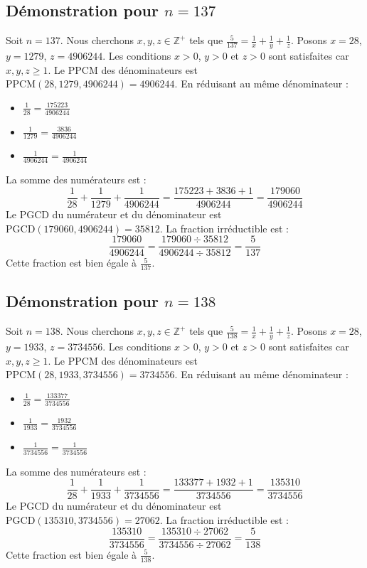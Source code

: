 \documentclass[11pt,a4paper]{article}
\begin{document}
\subsection{Démonstration pour $n = 137$}
Soit $n = 137$. Nous cherchons $x, y, z \in \mathbb{Z}^{+}$ tels que $\frac{5}{137} = \frac{1}{x} + \frac{1}{y} + \frac{1}{z}$.
Posons $x = 28$, $y = 1279$, $z = 4906244$.
Les conditions $x > 0$, $y > 0$ et $z > 0$ sont satisfaites car $x, y, z \geq 1$.
Le PPCM des dénominateurs est $\text{PPCM}(28, 1279, 4906244) = 4906244$.
En réduisant au même dénominateur :
\begin{itemize}
    \item $\frac{1}{28} = \frac{175223}{4906244}$
    \item $\frac{1}{1279} = \frac{3836}{4906244}$
    \item $\frac{1}{4906244} = \frac{1}{4906244}$
\end{itemize}
La somme des numérateurs est :
$$ \frac{1}{28} + \frac{1}{1279} + \frac{1}{4906244} = \frac{175223 + 3836 + 1}{4906244} = \frac{179060}{4906244} $$
Le PGCD du numérateur et du dénominateur est $\text{PGCD}(179060, 4906244) = 35812$.
La fraction irréductible est :
$$ \frac{179060}{4906244} = \frac{179060 \div 35812}{4906244 \div 35812} = \frac{5}{137} $$
Cette fraction est bien égale à $\frac{5}{137}$.

\subsection{Démonstration pour $n = 138$}
Soit $n = 138$. Nous cherchons $x, y, z \in \mathbb{Z}^{+}$ tels que $\frac{5}{138} = \frac{1}{x} + \frac{1}{y} + \frac{1}{z}$.
Posons $x = 28$, $y = 1933$, $z = 3734556$.
Les conditions $x > 0$, $y > 0$ et $z > 0$ sont satisfaites car $x, y, z \geq 1$.
Le PPCM des dénominateurs est $\text{PPCM}(28, 1933, 3734556) = 3734556$.
En réduisant au même dénominateur :
\begin{itemize}
    \item $\frac{1}{28} = \frac{133377}{3734556}$
    \item $\frac{1}{1933} = \frac{1932}{3734556}$
    \item $\frac{1}{3734556} = \frac{1}{3734556}$
\end{itemize}
La somme des numérateurs est :
$$ \frac{1}{28} + \frac{1}{1933} + \frac{1}{3734556} = \frac{133377 + 1932 + 1}{3734556} = \frac{135310}{3734556} $$
Le PGCD du numérateur et du dénominateur est $\text{PGCD}(135310, 3734556) = 27062$.
La fraction irréductible est :
$$ \frac{135310}{3734556} = \frac{135310 \div 27062}{3734556 \div 27062} = \frac{5}{138} $$
Cette fraction est bien égale à $\frac{5}{138}$.
\end{document}
